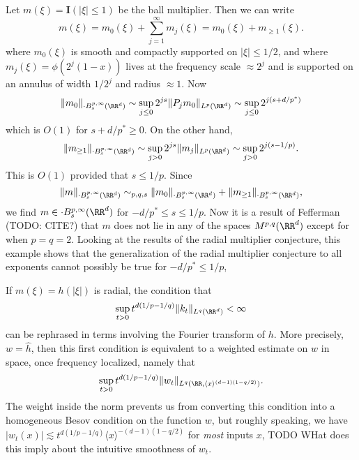 


\begin{remark}
    Let $m(\xi) = \mathbf{I}(|\xi| \leq 1)$ be the ball multiplier. Then we can write
    \[ m(\xi) = m_0(\xi) + \sum_{j = 1}^\infty m_j(\xi) = m_0(\xi) + m_{\geq 1}(\xi). \]
    where $m_0(\xi)$ is smooth and compactly supported on $|\xi| \leq 1/2$, and where $m_j(\xi) = \phi(2^j (1 - x))$ lives at the frequency scale $\approx 2^j$ and is supported on an annulus of width $1/2^j$ and radius $\approx 1$.    Now
    \[ \| m_0 \|_{\cdot{B}^{p,\infty}_s(\RR^d)} \sim \sup_{j \leq 0} 2^{js} \| P_j m_0 \|_{L^p(\RR^d)} \sim \sup_{j \leq 0} 2^{j(s + d/p^*)} \]
    which is $O(1)$ for $s + d/p^* \geq 0$. On the other hand,
    \[ \| m_{\geq 1} \|_{\cdot{B}^{p,\infty}_s(\RR^d)} \sim \sup_{j > 0} 2^{js} \| m_j \|_{L^p(\RR^d)} \sim \sup_{j > 0} 2^{j(s - 1/p)}. \]
    This is $O(1)$ provided that $s \leq 1/p$. Since
    \[ \| m \|_{\cdot{B}^{p,\infty}_s(\RR^d)} \sim_{p,q,s} \| m_0 \|_{\cdot{B}^{p,\infty}_s(\RR^d)} + \| m_{\geq 1} \|_{\cdot{B}^{p,\infty}_s(\RR^d)}, \]
    we find $m \in \cdot{B}^{p,\infty}_s(\RR^d)$ for $-d/p^* \leq s \leq 1/p$. Now it is a result of Fefferman (TODO: CITE?) that $m$ does not lie in any of the spaces $M^{p,q}(\RR^d)$ except for when $p = q = 2$. Looking at the results of the radial multiplier conjecture, this example shows that the generalization of the radial multiplier conjecture to all exponents cannot possibly be true for $-d/p^* \leq 1/p$,
\end{remark}

\begin{remark}
    If $m(\xi) = h(|\xi|)$ is radial, the condition that
    \[ \sup_{t > 0} t^{d(1/p - 1/q)} \| k_t \|_{L^q(\RR^d)} < \infty \]
    can be rephrased in terms involving the Fourier transform of $h$. More precisely, $w = \widehat{h}$, then this first condition is equivalent to a weighted estimate on $w$ in space, once frequency localized, namely that
    \[ \sup_{t > 0} t^{d(1/p - 1/q)} \| w_t \|_{L^q(\RR, \langle x \rangle^{(d-1)(1 - q/2)})}. \]
    The weight inside the norm prevents us from converting this condition into a homogeneous Besov condition on the function $w$, but roughly speaking, we have $|w_t(x)| \lesssim t^{d(1/p-1/q)} \langle x \rangle^{-(d-1)(1-q/2)}$ for \emph{most} inputs $x$, TODO WHat does this imply about the intuitive smoothness of $w_t$.
\end{remark}

